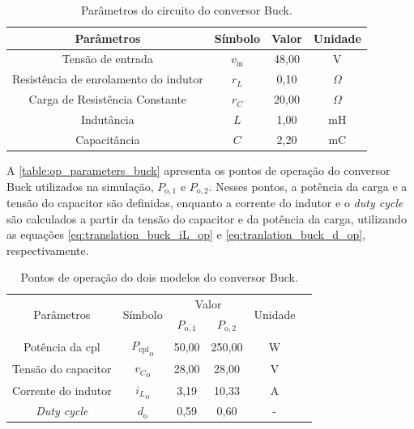 \vspace{8pt}
\begin{table}[H]
  \centering
  \begin{tabular}{cccc}
    \toprule
    Parâmetros & Símbolo  & Valor & Unidade \\
    \midrule
    Tensão de entrada & $v_{\mathrm{in}}$ & 48,00 & V \\
    Resistência de enrolamento do indutor & $r_L$ & 0,10 & $\Omega$ \\
    Carga de Resistência Constante & $r_{C}$ & 20,00 & $\Omega$ \\
    Indutância & $L$ & 1,00 & mH \\
    Capacitância  & $C$ & 2,20 & mC \\
    \bottomrule
  \end{tabular}
  \caption{Parâmetros do circuito do conversor Buck.}
  \label{table:circuit_parameter_buck}
\end{table}

A \autoref{table:op_parameters_buck} apresenta os pontos de operação do conversor Buck utilizados na simulação, $P_{\mathrm{o}, 1}$ e $P_{\mathrm{o}, 2}$. Nesses pontos, a potência da carga e a tensão do capacitor são definidas, enquanto a corrente do indutor e o \textit{duty cycle} são calculados a partir da tensão do capacitor e da potência da carga, utilizando as equações \eqref{eq:translation_buck_iL_op} e \eqref{eq:tranlation_buck_d_op}, respectivamente.

\vspace{8pt}
\begin{table}[H]
  \centering
  \setlength{\tabcolsep}{10pt}
  \begin{tabular}{cccccc}
    \toprule
    \multirow{2}{*}{\centering Parâmetros} & \multirow{2}{*}{\centering Símbolo} & \multicolumn{2}{c}{\centering Valor} & \multirow{2}{*}{\centering Unidade} \\
    \cmidrule{3-4}
     &  & $P_{\mathrm{o}, 1}$ & $P_{\mathrm{o}, 2}$ &  \\
    \midrule
    Potência da \acrshort{cpl} & ${P_{\mathrm{cpl}}}_{\mathrm{o}}$ & 50,00  & 250,00 & W \\
    Tensão do capacitor & ${v_C}_{\mathrm{o}}$ & 28,00 & 28,00  & V \\
    Corrente do indutor & ${i_L}_{\mathrm{o}}$ & 3,19 & 10,33 & A \\
    \textit{Duty cycle} & $d_{\mathrm{o}}$ & 0,59 & 0,60 & - \\  
    \bottomrule
  \end{tabular}
  \caption{Pontos de operação do dois modelos do conversor Buck.}
  \label{table:op_parameters_buck}
\end{table}

